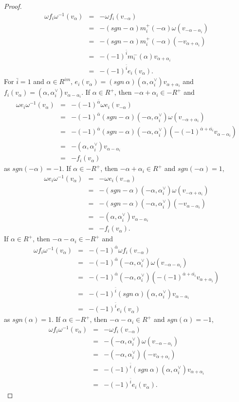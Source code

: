 \documentclass[11pt]{amsart}
\theoremstyle{plain}
\theoremstyle{definition}
\numberwithin{equation}{section}
\newcommand{\al}{\alpha}
\newcommand{\om}{\omega}
\begin{document}
\begin{proof}
		\begin{eqnarray*}
			\om f_i\om^{-1}(v_{\al})&=&-\om f_i(v_{-\al})\\&=&-(sgn-\al)m_i^+(-\al)\om(v_{-\al-\al_i})\\&=&-(sgn-\al)m_i^+(-\al)(-v_{\al+\al_i})\\&=&-(-1)^{\bar{i}}m_i^-(\al)v_{\al+\al_i}\\&=&-(-1)^{\bar{i}}e_i(v_{\al}).
		\end{eqnarray*}
		For $\bar{i}=1$ and $\al\in R^{im}$, $e_i(v_{\al})=(sgn~\al)(\al,\al_i^{\vee})v_{\al+\al_i}$ and $f_i(v_{\al})=(\al,\al_i^{\vee})v_{\al-\al_i}$.
		If $\al\in R^+$, then $-\al+\al_i\in-R^+$ and
		\begin{eqnarray*}
			\om e_i\om^{-1}(v_{\al})&=&-(-1)^{\bar{\al}}\om e_i(v_{-\al})\\&=&-(-1)^{\bar{\al}}(sgn-\al)(-\al,\al_i^{\vee})\om(v_{-\al+\al_i})\\&=&-(-1)^{\bar{\al}}(sgn-\al)(-\al,\al_i^{\vee})(-(-1)^{\bar{\al}+\bar{\al_i}}v_{\al-\al_i})\\&=&-(\al,\al_i^{\vee})v_{\al-\al_i}\\&=&-f_i(v_{\al})
		\end{eqnarray*}
		as $sgn(-\al)=-1$. If $\al\in-R^+$, then $-\al+\al_i\in R^+$ and $sgn(-\al)=1$,
		\begin{eqnarray*}
			\om e_i\om^{-1}(v_{\al})&=&-\om e_i(v_{-\al})\\&=&-(sgn-\al)(-\al,\al_i^{\vee})\om(v_{-\al+\al_i})\\&=&-(sgn-\al)(-\al,\al_i^{\vee})(-v_{\al-\al_i})\\&=&-(\al,\al_i^{\vee})v_{\al-\al_i}\\&=&-f_i(v_{\al}).
		\end{eqnarray*}
		If $\al\in R^+$, then $-\al-\al_i\in-R^+$ and
		\begin{eqnarray*}
			\om f_i\om^{-1}(v_{\al})&=&-(-1)^{\bar{\al}}\om f_i(v_{-\al})\\&=&-(-1)^{\bar{\al}}(-\al,\al_i^{\vee})\om(v_{-\al-\al_i})\\&=&-(-1)^{\bar{\al}}(-\al,\al_i^{\vee})(-(-1)^{\bar{\al}+\bar{\al_i}}v_{\al+\al_i})\\&=&-(-1)^{\bar{i}}(sgn~\al)(\al,\al_i^{\vee})v_{\al-\al_i}\\&=&-(-1)^{\bar{i}}e_i(v_{\al})
		\end{eqnarray*}
		as $sgn(\al)=1$. If $\al\in-R^+$, then $-\al-\al_i\in R^+$ and $sgn(\al)=-1$,
		\begin{eqnarray*}
			\om f_i\om^{-1}(v_{\al})&=&-\om f_i(v_{-\al})\\&=&-(-\al,\al_i^{\vee})\om(v_{-\al-\al_i})\\&=&-(-\al,\al_i^{\vee})(-v_{\al+\al_i})\\&=&-(-1)^{\bar{i}}(sgn~\al)(\al,\al_i^{\vee})v_{\al+\al_i}\\&=&-(-1)^{\bar{i}}e_i(v_{\al}).
		\end{eqnarray*}
	\end{proof}
	
\end{document}
